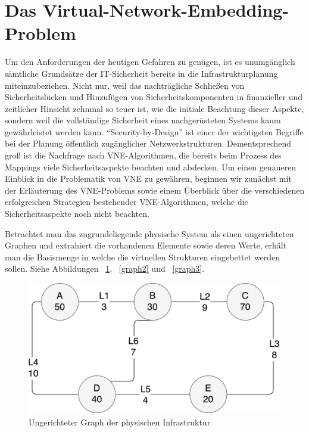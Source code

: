 \documentclass{lni}
\begin{document}
\section{Das Virtual-Network-Embedding-Problem}
\label{sec:VNE-Problem}
Um den Anforderungen der heutigen Gefahren zu genügen, ist es unumgänglich sämtliche Grundsätze der IT-Sicherheit bereits in die Infrastrukturplanung miteinzubeziehen. Nicht nur, weil das nachträgliche Schließen von Sicherheitslücken und Hinzufügen von Sicherheitskomponenten in finanzieller und zeitlicher Hinsicht zehnmal so teuer ist, wie die initiale Beachtung dieser Aspekte, sondern weil die vollständige Sicherheit eines nachgerüsteten Systems kaum gewährleistet werden kann. \cite{Cole} "`Security-by-Design"' ist einer der wichtigsten Begriffe bei der Planung öffentlich zugänglicher Netzwerkstrukturen. Dementsprechend groß ist die Nachfrage nach VNE-Algorithmen, die bereits beim Prozess des Mappings viele Sicherheitsaspekte beachten und abdecken. 
Um einen genaueren Einblick in die Problematik von VNE zu gewähren, beginnen wir zunächst mit der Erläuterung des VNE-Problems sowie einem Überblick über die verschiedenen erfolgreichen Strategien bestehender VNE-Algorithmen, welche die Sicherheitsaspekte noch nicht beachten.

Betrachtet man das zugrundeliegende physische System als einen ungerichteten Graphen und extrahiert die vorhandenen Elemente sowie deren Werte, erhält man die Basismenge in welche die virtuellen Strukturen eingebettet werden sollen. Siehe Abbildungen ~\ref{graph1}, ~\ref{graph2} und ~\ref{graph3}.



\begin{figure}[htb]
\begin{center}
\includegraphics[width=\textwidth]{physical_structure2.pdf}\newline
\caption{\label{graph1}Ungerichteter Graph der physischen Infrastruktur}
\end{center}
\end{figure}
\end{document}
